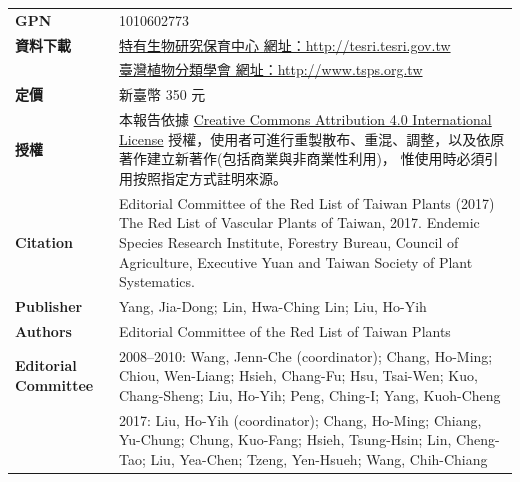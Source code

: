\begin{table}[H]
{\begin{tabular}{>{\raggedleft\arraybackslash}p{2.5cm}p{9cm}}
      \textbf{GPN}               & 1010602773 \\
      \textbf{資料下載}          & \href{http://tesri.tesri.gov.tw}{特有生物研究保育中心 網址：http://tesri.tesri.gov.tw} \\
                                 & \href{http://www.tsps.org.tw}{臺灣植物分類學會 網址：http://www.tsps.org.tw} \\
      \textbf{定價}              & 新臺幣 350 元 \\
      \textbf{授權}              & 本報告依據
                                   \href{https://creativecommons.org/licenses/by/4.0}{Creative Commons Attribution 4.0 International License}
                                   授權，使用者可進行重製散布、重混、調整，以及依原著作建立新著作(包括商業與非商業性利用)，
                                   惟使用時必須引用按照指定方式註明來源。 \\
      \textbf{Citation}          & Editorial Committee of the Red List of Taiwan Plants (2017) The Red List of Vascular Plants of Taiwan, 2017.
                                   Endemic Species Research Institute, Forestry Bureau, Council of Agriculture, 
                                   Executive Yuan and Taiwan Society of Plant Systematics. \\
      \textbf{Publisher}         & Yang, Jia-Dong; Lin, Hwa-Ching Lin; Liu, Ho-Yih \\
      \textbf{Authors}           & Editorial Committee of the Red List of Taiwan Plants \\
      \textbf{Editorial Committee} & 2008--2010: Wang, Jenn-Che (coordinator);
                                     Chang, Ho-Ming;
                                     Chiou, Wen-Liang;
                                     Hsieh, Chang-Fu;
                                     Hsu, Tsai-Wen;
                                     Kuo, Chang-Sheng;
                                     Liu, Ho-Yih;
                                     Peng, Ching-I;
                                     Yang, Kuoh-Cheng \\
                                   &  2017: Liu, Ho-Yih (coordinator);
                                     Chang, Ho-Ming;
                                     Chiang, Yu-Chung;
                                     Chung, Kuo-Fang;
                                     Hsieh, Tsung-Hsin; 
                                     Lin, Cheng-Tao;
                                     Liu, Yea-Chen;
                                     Tzeng, Yen-Hsueh; 
                                     Wang, Chih-Chiang \\

\end{tabular}}
\end{table}
